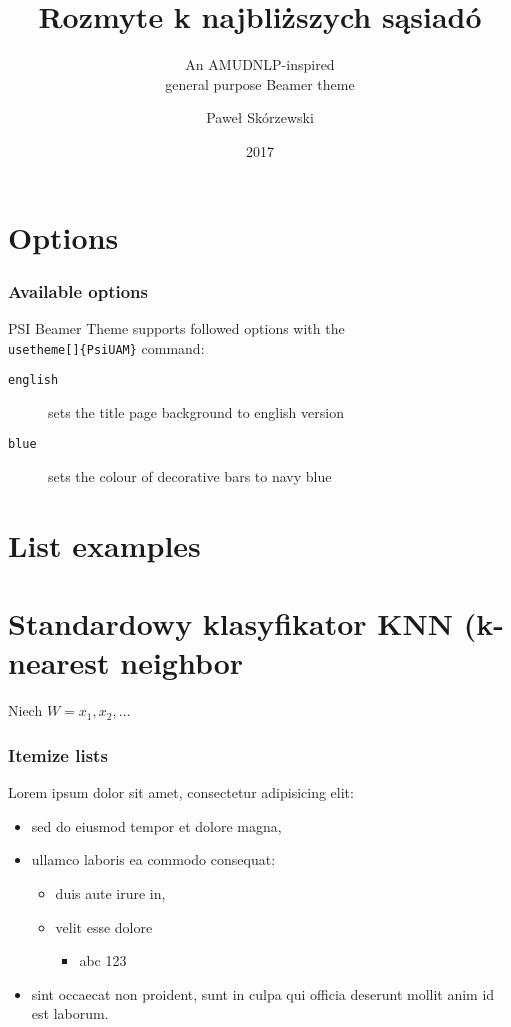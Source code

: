 \documentclass{beamer}
\title{Rozmyte k najbliższych sąsiadó}
\subtitle{An AMUDNLP-inspired\\general purpose Beamer theme}
\author[{P. Sk{\'o}rzewski}]{Pawe{\l} Sk{\'o}rzewski}
\date{2017}
\begin{document}
\begin{frame}
	\titlepage
\end{frame}


\section{Options}

\begin{frame}
	\frametitle{Available options}
    PSI Beamer Theme supports followed options with the 
    \texttt{\\usetheme[]\{PsiUAM\}} command:
		\begin{description}
 			\item [\texttt{english}] sets the title page background to english version
 			\item [\texttt{blue}] sets the colour of decorative bars to navy blue
 		\end{description}
\end{frame}



\section{List examples}



\section{Standardowy klasyfikator KNN (k-nearest neighbor}

\begin{frame}
Niech $W = {x_1,x_2, \ldots}$

\end{frame}






\begin{frame}

	\frametitle{Itemize lists}
    Lorem ipsum dolor sit amet, consectetur adipisicing elit:
		\begin{itemize}
			\item sed do eiusmod tempor et dolore magna,
      \item ullamco laboris ea commodo consequat:
      \begin{itemize}
        \item duis aute irure in,
        \item velit esse dolore
        \begin{itemize}
          \item abc 123
         \end{itemize}
      \end{itemize}
      \item sint occaecat non proident, sunt in culpa qui officia 
        deserunt mollit anim id est laborum.
		\end{itemize}

\end{frame}
\end{document}
